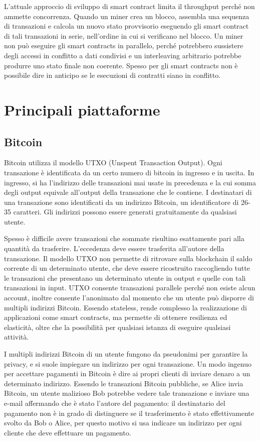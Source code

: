 L'attuale approccio di sviluppo di smart contract limita il throughput perché non ammette concorrenza. Quando un miner crea un blocco, assembla una sequenza di transazioni e calcola un nuovo stato provvisorio eseguendo gli smart contract di tali transazioni in serie, nell'ordine in cui si verificano nel blocco. Un miner non può eseguire gli smart contracts in parallelo, perché potrebbero sussistere degli accessi in conflitto a dati condivisi e un interleaving arbitrario potrebbe produrre uno stato finale non coerente. Spesso per gli smart contracts non è possibile dire in anticipo se le esecuzioni di contratti siano in conflitto.


\section{Principali piattaforme}

\subsection{Bitcoin}


Bitcoin utilizza il modello UTXO (Unspent Transaction Output). Ogni transazione è identificata da un certo numero di bitcoin in ingresso e in uscita. In ingresso, si ha l'indirizzo delle transazioni mai usate in precedenza e la cui somma degli output equivale all'output della transazione che le contiene. I destinatari di una transazione sono identificati da un indirizzo Bitcoin, un identificatore di 26-35 caratteri. Gli indirizzi possono essere generati gratuitamente da qualsiasi utente.

Spesso è difficile avere transazioni che sommate risultino esattamente pari alla quantità da trasferire. L'eccedenza deve essere trasferita all'autore della transazione. Il modello UTXO non permette di ritrovare sulla blockchain il saldo corrente di un determinato utente, che deve essere ricostruito raccogliendo tutte le transazioni che presentano un determinato utente in output e quelle con tali transazioni in input. UTXO consente transazioni parallele perché non esiste alcun account, inoltre consente l'anonimato dal momento che un utente può disporre di multipli indirizzi Bitcoin. Essendo stateless, rende complesso la realizzazione di applicazioni come smart contracts, ma permette di ottenere resilienza ed elasticità, oltre che la possibilità per qualsiasi istanza di eseguire qualsiasi attività.

I multipli indirizzi Bitcoin di un utente fungono da pseudonimi per garantire la privacy, e si suole impiegare un indirizzo per ogni transazione. Un modo ingenuo per accettare pagamenti in Bitcoin è dire ai propri clienti di inviare denaro a un determinato indirizzo. Essendo le transazioni Bitcoin pubbliche, se Alice invia Bitcoin, un utente malizioso Bob potrebbe vedere tale transazione e inviare una e-mail affermando che è stato l'autore del pagamento: il destinatario del pagamento non è in grado di distinguere se il trasferimento è stato effettivamente svolto da Bob o Alice, per questo motivo si usa indicare un indirizzo per ogni cliente che deve effettuare un pagamento.

